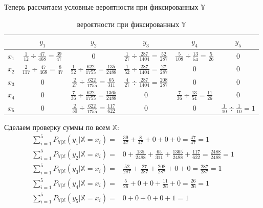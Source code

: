 \documentclass[a4paper,12pt]{article}
\begin{document}
  Теперь рассчитаем условные вероятности при фиксированных $\mathbb{Y}$
  \begin{table}[H]
    \centering
    \renewcommand{\arraystretch}{1.5}
    \begin{tabular}{| c | c | c | c | c | c |}
      \hline
      \cellcolor{gray}{} & $y_1$ & $y_2$ & $y_3$ & $y_4$ & $y_5$ \\
      \hline
      $x_1$ & $\frac{1}{12} \div \frac{47}{468} = \frac{39}{47}$ &
      $0$ & $\frac{1}{27} \div \frac{287}{1404} = \frac{52}{287}$ &
      $\frac{5}{108} \div \frac{13}{54} = \frac{5}{26}$ & $0$ \\
      \hline
      $x_2$ & $\frac{2}{117} \div \frac{47}{468} = \frac{8}{47}$ &
      $\frac{1}{52} \div \frac{622}{1755} = \frac{135}{2488}$ &
      $\frac{1}{52} \div \frac{287}{1404} = \frac{27}{287}$ &
      $0$ & $0$ \\ \hline
      $x_3$ & $0$ & $\frac{2}{27} \div \frac{622}{1755} = \frac{65}{311}$ &
      $\frac{4}{27} \div \frac{287}{1404} = \frac{208}{287}$ & $0$ & $0$ \\
      \hline
      $x_4$ & $0$ & $\frac{7}{36} \div \frac{622}{1755} = \frac{1365}{2488}$ &
      $0$ & $\frac{7}{36} \div \frac{13}{54} = \frac{11}{26}$ & $0$ \\
      \hline
      $x_5$ & $0$ & $\frac{2}{30} \div \frac{622}{1755} = \frac{117}{622}$ &
      $0$ & $0$ & $\frac{1}{10} \div \frac{1}{10} = 1$ \\
      \hline
    \end{tabular}
    \caption{вероятности при фиксированных $\mathbb{Y}$}
  \end{table}

  Сделаем проверку суммы по всем $\mathbb{X}$:
  \begin{equation}
    \begin{aligned}
      \sum\limits_{i = 1}^5P_{\mathbb{Y}|\mathbb{X}}(y_1|\mathbb{X} = x_i) = &
      \frac{39}{47} + \frac{8}{47} + 0 + 0 + 0 = \frac{47}{47} = 1 \\
      \sum\limits_{i = 1}^5P_{\mathbb{Y}|\mathbb{X}}(y_2|\mathbb{X} = x_i) = &
      0 + \frac{135}{2488} + \frac{65}{311} + \frac{1365}{2488} + \frac{117}{622} =
      \frac{2488}{2488} = 1\\
      \sum\limits_{i = 1}^5P_{\mathbb{Y}|\mathbb{X}}(y_3|\mathbb{X} = x_i) = &
      \frac{52}{287} + \frac{27}{287} + \frac{208}{287} + 0 + 0 = \frac{287}{287} = 1 \\
      \sum\limits_{i = 1}^5P_{\mathbb{Y}|\mathbb{X}}(y_4|\mathbb{X} = x_i) = &
      \frac{5}{26} + 0 + 0 + \frac{11}{26} + 0 = \frac{26}{26} = 1 \\
      \sum\limits_{i = 1}^5P_{\mathbb{Y}|\mathbb{X}}(y_5|\mathbb{X} = x_i) = &
      0 + 0 + 0 + 0 + 1 = 1
    \end{aligned}
  \end{equation}
\end{document}
